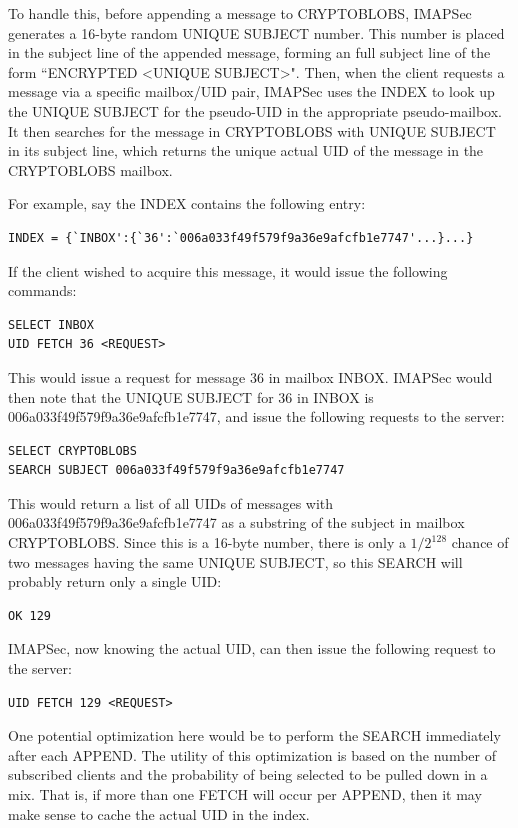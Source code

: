 \documentclass[pageno]{jpaper}
\newcommand{\project}{IMAPSec }
\newcommand{\projectnospace}{IMAPSec}
\begin{document}
To handle this, before appending a message to CRYPTOBLOBS, \project generates a 16-byte random UNIQUE SUBJECT number. This number is placed in the subject line of the appended message, forming an full subject line of the form ``ENCRYPTED <UNIQUE SUBJECT>". Then, when the client requests a message via a specific mailbox/UID pair, \project uses the INDEX to look up the UNIQUE SUBJECT for the pseudo-UID in the appropriate pseudo-mailbox. It then searches for the message in CRYPTOBLOBS with UNIQUE SUBJECT in its subject line, which returns the unique actual UID of the message in the CRYPTOBLOBS mailbox.

For example, say the INDEX contains the following entry:

\begin{lstlisting}
INDEX = {`INBOX':{`36':`006a033f49f579f9a36e9afcfb1e7747'...}...}
\end{lstlisting}

If the client wished to acquire this message, it would issue the following commands:

\begin{lstlisting}
SELECT INBOX
UID FETCH 36 <REQUEST>
\end{lstlisting}

This would issue a request for message 36 in mailbox INBOX. \project would then note that
the UNIQUE SUBJECT for 36 in INBOX is 006a033f49f579f9a36e9afcfb1e7747, and issue the following requests to the server:

\begin{lstlisting}
SELECT CRYPTOBLOBS
SEARCH SUBJECT 006a033f49f579f9a36e9afcfb1e7747
\end{lstlisting}

This would return a list of all UIDs of messages with 006a033f49f579f9a36e9afcfb1e7747 as a substring of the subject in mailbox CRYPTOBLOBS. Since this is a 16-byte number, there is only a $1/2^{128}$ chance of two messages having the same UNIQUE SUBJECT, so this SEARCH will probably return only a single UID:

\begin{lstlisting}
OK 129
\end{lstlisting}


\projectnospace, now knowing the actual UID, can then issue the following request to the server:

\begin{lstlisting}
UID FETCH 129 <REQUEST>
\end{lstlisting}

One potential optimization here would be to perform the SEARCH immediately after each APPEND. The utility of this optimization is based on the number of subscribed clients and the probability of being selected to be pulled down in a mix. That is, if more than one FETCH will occur per APPEND, then it may make sense to cache the actual UID in the index.
\end{document}
